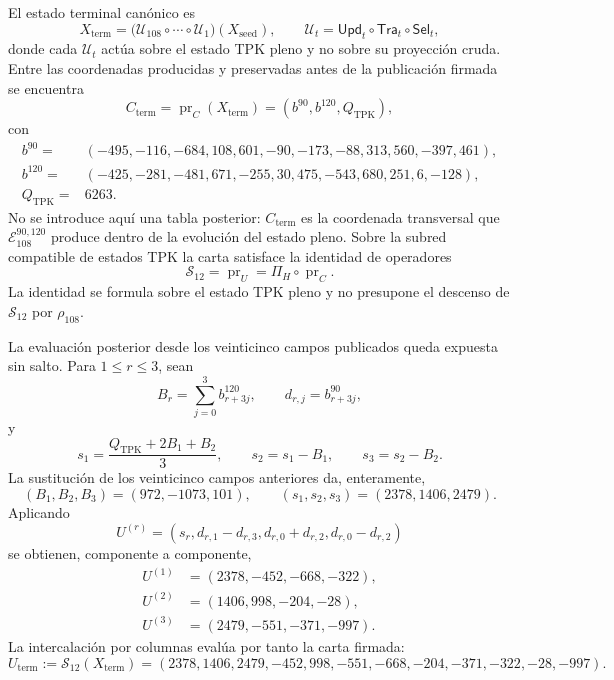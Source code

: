 El estado terminal canónico es
\[
 X_{\mathrm{term}}
 =\bigl(\mathcal U_{108}\circ\cdots\circ\mathcal U_1\bigr)
   (X_{\mathrm{seed}}),
 \qquad
 \mathcal U_t=\mathsf{Upd}_t\circ\mathsf{Tra}_t\circ\mathsf{Sel}_t,
\]
donde cada \(\mathcal U_t\) actúa sobre el estado TPK pleno y no sobre su
proyección cruda. Entre las coordenadas producidas y preservadas antes de la
publicación firmada se encuentra
\[
 C_{\mathrm{term}}=\operatorname{pr}_{C}(X_{\mathrm{term}})
 =(b^{90},b^{120},Q_{\mathrm{TPK}}),
\]
con
\begin{align*}
 b^{90}={}&(-495,-116,-684,108,601,-90,
              -173,-88,313,560,-397,461),\\
 b^{120}={}&(-425,-281,-481,671,-255,30,
               475,-543,680,251,6,-128),\\
 Q_{\mathrm{TPK}}={}&6263.
\end{align*}
No se introduce aquí una tabla posterior: \(C_{\mathrm{term}}\) es la
coordenada transversal que \(\mathcal E_{108}^{90,120}\) produce dentro de
la evolución del estado pleno. Sobre la subred compatible de estados TPK la
carta satisface la identidad de operadores
\begin{equation}
 \mathcal S_{12}=\operatorname{pr}_{U}
 =\Pi_H\circ\operatorname{pr}_{C}.
 \label{eq:registro-identidad-s12-pih}
\end{equation}
La identidad se formula sobre el estado TPK pleno y no presupone el descenso
de \(\mathcal S_{12}\) por \(\rho_{108}\).

La evaluación posterior desde los veinticinco campos publicados queda
expuesta sin salto. Para \(1\le r\le3\),
sean
\[
 B_r=\sum_{j=0}^{3}b^{120}_{r+3j},\qquad
 d_{r,j}=b^{90}_{r+3j},
\]
y
\[
 s_1=\frac{Q_{\mathrm{TPK}}+2B_1+B_2}{3},\qquad
 s_2=s_1-B_1,\qquad s_3=s_2-B_2.
\]
La sustitución de los veinticinco campos anteriores da, enteramente,
\[
 (B_1,B_2,B_3)=(972,-1073,101),\qquad
 (s_1,s_2,s_3)=(2378,1406,2479).
\]
Aplicando
\[
 U^{(r)}=(s_r,d_{r,1}-d_{r,3},d_{r,0}+d_{r,2},d_{r,0}-d_{r,2})
\]
se obtienen, componente a componente,
\begin{align*}
 U^{(1)}&=(2378,-452,-668,-322),\\
 U^{(2)}&=(1406,998,-204,-28),\\
 U^{(3)}&=(2479,-551,-371,-997).
\end{align*}
La intercalación por columnas evalúa por tanto la carta firmada:
\begin{equation}
 U_{\mathrm{term}}:=\mathcal S_{12}(X_{\mathrm{term}})
 =(2378,1406,2479,-452,998,-551,-668,-204,-371,-322,-28,-997).
 \label{eq:registro-uterm-desde-estado-pleno}
\end{equation}

